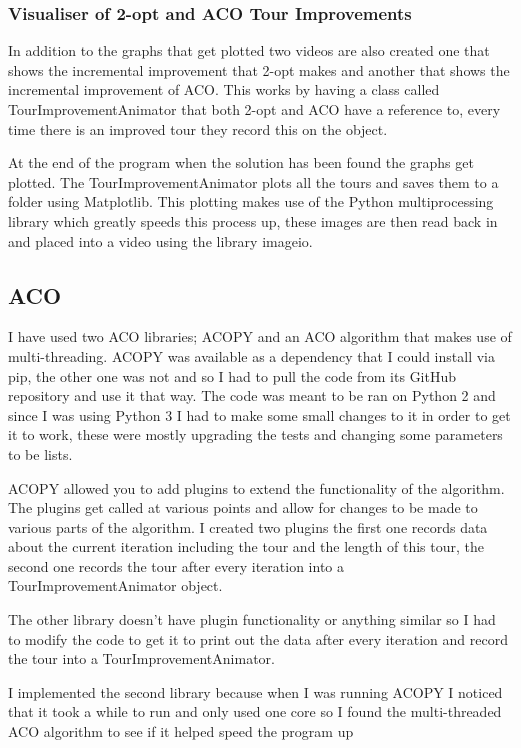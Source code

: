 \subsubsection{Visualiser of 2-opt and ACO Tour Improvements}

In addition to the graphs that get plotted two videos are also created one that shows the incremental improvement that 2-opt makes and another that shows the incremental improvement of ACO. This works by having a class called TourImprovementAnimator that both 2-opt and ACO have a reference to, every time there is an improved tour they record this on the object.

At the end of the program when the solution has been found the graphs get plotted. The TourImprovementAnimator plots all the tours and saves them to a folder using Matplotlib\cite{matplotlib}. This plotting makes use of the Python multiprocessing library which greatly speeds this process up, these images are then read back in and placed into a video using the library imageio\cite{imageio}.

\subsection{ACO}

I have used two ACO libraries; ACOPY\cite{acopy} and an ACO algorithm that makes use of multi-threading\cite{multithreaded_aco}. ACOPY was available as a dependency that I could install via pip, the other one was not and so I had to pull the code from its GitHub repository and use it that way. The code was meant to be ran on Python 2 and since I was using Python 3 I had to make some small changes to it in order to get it to work, these were mostly upgrading the tests and changing some parameters to be lists. 

ACOPY allowed you to add plugins to extend the functionality of the algorithm. The plugins get called at various points and allow for changes to be made to various parts of the algorithm. I created two plugins the first one records data about the current iteration including the tour and the length of this tour, the second one records the tour after every iteration into a TourImprovementAnimator object.

The other library doesn't have plugin functionality or anything similar so I had to modify the code to get it to print out the data after every iteration and record the tour into a TourImprovementAnimator.

I implemented the second library because when I was running ACOPY I noticed that it took a while to run and only used one core so I found the multi-threaded ACO algorithm to see if it helped speed the program up

